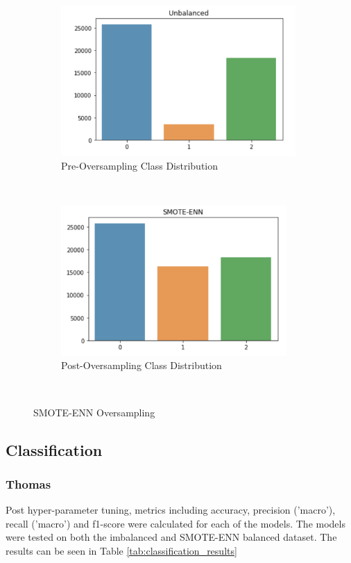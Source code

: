 \documentclass[conference]{IEEEtran}
\begin{document}
\begin{figure}[t!]
  \centering
  \begin{subfigure}[t]{0.5\textwidth}
      \centering
      \includegraphics[height=2.25in]{figures/tom_smote_1}
      \caption{Pre-Oversampling Class Distribution}
  \end{subfigure}%
  ~
  \begin{subfigure}[t]{0.5\textwidth}
      \centering
      \includegraphics[height=2.25in]{figures/tom_smote_2}
      \caption{Post-Oversampling Class Distribution}
  \end{subfigure}
  ~
  \caption{SMOTE-ENN Oversampling}
  \label{fig:smote}
\end{figure}

\subsection{Classification}

\subsubsection{Thomas}

Post hyper-parameter tuning, metrics including accuracy, precision ('macro'), recall ('macro') and f1-score were calculated for each of the models. The models were tested on both the imbalanced and SMOTE-ENN balanced dataset. The results can be seen in Table \ref{tab:classification_results}
\end{document}
